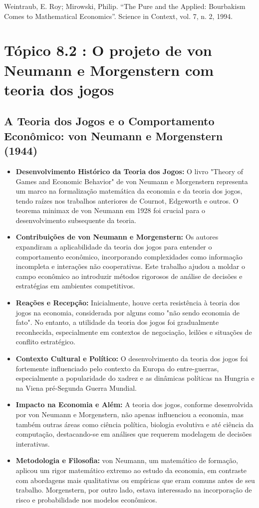 \documentclass[a4paper,12pt]{article}[abntex2]
\begin{document}
Weintraub, E. Roy; Mirowski, Philip. “The Pure and the Applied: Bourbakism Comes to
Mathematical Economics”. Science in Context, vol. 7, n. 2, 1994.

\newpage
\section{\textbf{Tópico 8.2 : O projeto de von Neumann e Morgenstern com teoria dos jogos}}
\subsection{A Teoria dos Jogos e o Comportamento Econômico: von Neumann e Morgenstern (1944)}
\begin{itemize}
  \item \textbf{Desenvolvimento Histórico da Teoria dos Jogos:} O livro "Theory of Games and Economic Behavior" de von Neumann e Morgenstern representa um marco na formalização matemática da economia e da teoria dos jogos, tendo raízes nos trabalhos anteriores de Cournot, Edgeworth e outros. O teorema minimax de von Neumann em 1928 foi crucial para o desenvolvimento subsequente da teoria.

  \item \textbf{Contribuições de von Neumann e Morgenstern:} Os autores expandiram a aplicabilidade da teoria dos jogos para entender o comportamento econômico, incorporando complexidades como informação incompleta e interações não cooperativas. Este trabalho ajudou a moldar o campo econômico ao introduzir métodos rigorosos de análise de decisões e estratégias em ambientes competitivos.

  \item \textbf{Reações e Recepção:} Inicialmente, houve certa resistência à teoria dos jogos na economia, considerada por alguns como "não sendo economia de fato". No entanto, a utilidade da teoria dos jogos foi gradualmente reconhecida, especialmente em contextos de negociação, leilões e situações de conflito estratégico.

  \item \textbf{Contexto Cultural e Político:} O desenvolvimento da teoria dos jogos foi fortemente influenciado pelo contexto da Europa do entre-guerras, especialmente a popularidade do xadrez e as dinâmicas políticas na Hungria e na Viena pré-Segunda Guerra Mundial.

  \item \textbf{Impacto na Economia e Além:} A teoria dos jogos, conforme desenvolvida por von Neumann e Morgenstern, não apenas influenciou a economia, mas também outras áreas como ciência política, biologia evolutiva e até ciência da computação, destacando-se em análises que requerem modelagem de decisões interativas.

  \item \textbf{Metodologia e Filosofia:} von Neumann, um matemático de formação, aplicou um rigor matemático extremo ao estudo da economia, em contraste com abordagens mais qualitativas ou empíricas que eram comuns antes de seu trabalho. Morgenstern, por outro lado, estava interessado na incorporação de risco e probabilidade nos modelos econômicos.
\end{itemize}
\end{document}
